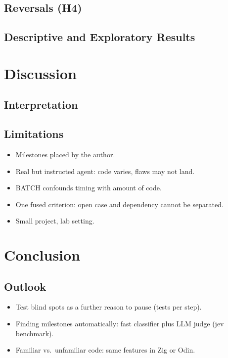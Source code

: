 \section{Reversals (H4)}
\section{Descriptive and Exploratory Results}


\chapter{Discussion}
\label{chap:discussion}

\section{Interpretation}

\section{Limitations}
\begin{itemize}
  \item Milestones placed by the author.
  \item Real but instructed agent: code varies, flaws may not land.
  \item BATCH confounds timing with amount of code.
  \item One fused criterion: open case and dependency cannot be separated.
  \item Small project, lab setting.
\end{itemize}


\chapter{Conclusion}
\label{sec:conclusion}

\section*{Outlook}
\begin{itemize}
  \item Test blind spots as a further reason to pause (tests per step).
  \item Finding milestones automatically: fast classifier plus LLM judge (jev benchmark).
  \item Familiar vs.\ unfamiliar code: same features in Zig or Odin.
\end{itemize}
